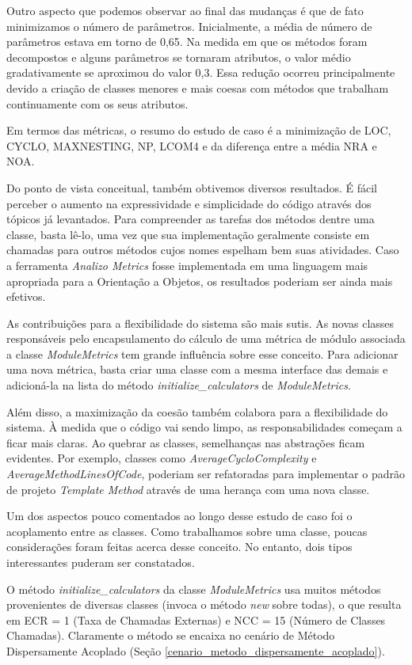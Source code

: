 Outro aspecto que podemos observar ao final das mudanças é que de fato minimizamos
o número de parâmetros. Inicialmente, a média de número de parâmetros estava em torno de 0,65.
Na medida em que os métodos foram decompostos e alguns parâmetros se tornaram atributos, o valor médio
gradativamente se aproximou do valor 0,3. Essa redução ocorreu principalmente devido a criação
de classes menores e mais coesas com métodos que trabalham continuamente com os
seus atributos.

Em termos das métricas, o resumo do estudo de caso é a minimização de LOC, CYCLO, MAXNESTING, NP,
LCOM4 e da diferença entre a média NRA e NOA.

Do ponto de vista conceitual, também obtivemos diversos resultados. É fácil perceber o aumento
na expressividade e simplicidade do código através dos tópicos já levantados. Para compreender
as tarefas dos métodos dentre uma classe, basta lê-lo, uma vez que sua implementação geralmente
consiste em chamadas para outros métodos cujos nomes espelham bem suas atividades. Caso a ferramenta
\textit{Analizo Metrics} fosse implementada em uma linguagem mais apropriada para a Orientação
a Objetos, os resultados poderiam ser ainda mais efetivos.

As contribuições para a flexibilidade do sistema são mais sutis. As novas classes responsáveis
pelo encapsulamento do cálculo de uma métrica de módulo associada a classe \textit{ModuleMetrics}
tem grande influência sobre esse conceito. Para adicionar uma nova métrica, basta criar uma classe
com a mesma interface das demais e adicioná-la na lista do método \textit{initialize\_calculators} de
\textit{ModuleMetrics}.

Além disso, a maximização da coesão também colabora para a flexibilidade do sistema. À medida que o código
vai sendo limpo, as responsabilidades começam a ficar mais claras. Ao quebrar as classes,
semelhanças nas abstrações ficam evidentes. Por exemplo, classes como \textit{AverageCycloComplexity}
e \textit{AverageMethodLinesOfCode}, poderiam ser refatoradas para implementar o padrão de projeto
\textit{Template Method} \citep{GOF95} através de uma herança com uma nova classe.

Um dos aspectos pouco comentados ao longo desse estudo de caso foi o acoplamento entre as classes.
Como trabalhamos sobre uma classe, poucas considerações foram feitas acerca desse conceito. No
entanto, dois tipos interessantes puderam ser constatados.

O método \textit{initialize\_calculators} da classe \textit{ModuleMetrics} usa muitos métodos
provenientes de diversas classes (invoca o método \textit{new} sobre todas), o que resulta em
ECR = 1 (Taxa de Chamadas Externas) e NCC = 15 (Número de Classes Chamadas).
Claramente o método se encaixa no cenário de Método Dispersamente Acoplado (Seção \ref{cenario_metodo_dispersamente_acoplado}).

